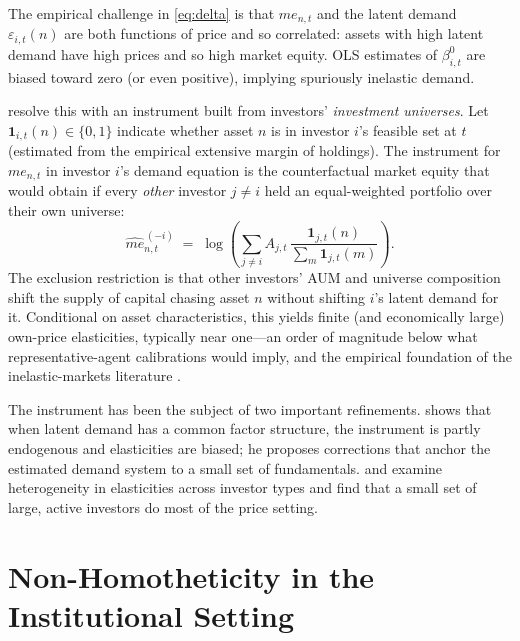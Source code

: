 \documentclass[11pt,a4paper]{article}
\newcommand{\eps}{\varepsilon}
\newcommand{\me}{\mathit{me}}
\begin{document}
The empirical challenge in \eqref{eq:delta} is that $\me_{n,t}$ and the
latent demand $\eps_{i,t}(n)$ are both functions of price and so
correlated: assets with high latent demand have high prices and so high
market equity. OLS estimates of $\beta^0_{i,t}$ are biased toward zero
(or even positive), implying spuriously inelastic demand.

\citet{koijen2019demand} resolve this with an instrument built from
investors' \emph{investment universes}. Let $\mathbf{1}_{i,t}(n) \in
\{0,1\}$ indicate whether asset $n$ is in investor $i$'s feasible set
at $t$ (estimated from the empirical extensive margin of holdings). The
instrument for $\me_{n,t}$ in investor $i$'s demand equation is the
counterfactual market equity that would obtain if every \emph{other}
investor $j \neq i$ held an equal-weighted portfolio over their own
universe:
\begin{equation}
\widehat{\me}_{n,t}^{\,(-i)} \;=\; \log\!\left( \sum_{j\neq i} A_{j,t}\,\frac{\mathbf{1}_{j,t}(n)}{\sum_m \mathbf{1}_{j,t}(m)} \right).
\end{equation}
The exclusion restriction is that other investors' AUM and universe
composition shift the supply of capital chasing asset $n$ without
shifting $i$'s latent demand for it. Conditional on asset
characteristics, this yields finite (and economically large) own-price
elasticities, typically near one---an order of magnitude below what
representative-agent calibrations would imply, and the empirical
foundation of the inelastic-markets literature
\citep{gabaix2021inelastic}.

The instrument has been the subject of two important refinements.
\citet{vanderbeck2022estimation} shows that when latent demand has a
common factor structure, the instrument is partly endogenous and
elasticities are biased; he proposes corrections that anchor the
estimated demand system to a small set of fundamentals.
\citet{haddad2025competitive} and \citet{koijen2024which} examine
heterogeneity in elasticities across investor types and find that a
small set of large, active investors do most of the price setting.

\section{Non-Homotheticity in the Institutional Setting}
\end{document}
